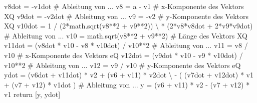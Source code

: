 \documentclass[
  letterpaper,
  DIV=11,
  oneside]{scrreprt}
\newenvironment{Shaded}{\begin{snugshade}}{\end{snugshade}}
\newcommand{\CommentTok}[1]{\textcolor[rgb]{0.37,0.37,0.37}{#1}}
\newcommand{\ControlFlowTok}[1]{\textcolor[rgb]{0.00,0.23,0.31}{#1}}
\newcommand{\DecValTok}[1]{\textcolor[rgb]{0.68,0.00,0.00}{#1}}
\newcommand{\NormalTok}[1]{\textcolor[rgb]{0.00,0.23,0.31}{#1}}
\newcommand{\OperatorTok}[1]{\textcolor[rgb]{0.37,0.37,0.37}{#1}}
\theoremstyle{definition}
\theoremstyle{definition}
\theoremstyle{remark}
\begin{document}
\begin{tcolorbox}
\begin{Shaded}
\begin{Highlighting}[]
\NormalTok{    v8dot }\OperatorTok{=} \OperatorTok{{-}}\NormalTok{v1dot     }\CommentTok{\# Ableitung von ...}
\NormalTok{    v8 }\OperatorTok{=}\NormalTok{ a }\OperatorTok{{-}}\NormalTok{ v1        }\CommentTok{\# x{-}Komponente des Vektors XQ}
\NormalTok{    v9dot }\OperatorTok{=} \OperatorTok{{-}}\NormalTok{v2dot     }\CommentTok{\# Ableitung von ...}
\NormalTok{    v9 }\OperatorTok{=} \OperatorTok{{-}}\NormalTok{v2           }\CommentTok{\# y{-}Komponente des Vektors XQ}
\NormalTok{    v10dot }\OperatorTok{=} \DecValTok{1} \OperatorTok{/}\NormalTok{ (}\DecValTok{2}\OperatorTok{*}\NormalTok{math.sqrt(v8}\OperatorTok{**}\DecValTok{2} \OperatorTok{+}\NormalTok{ v9}\OperatorTok{**}\DecValTok{2}\NormalTok{)) }\OperatorTok{\textbackslash{}}
        \OperatorTok{*}\NormalTok{ (}\DecValTok{2}\OperatorTok{*}\NormalTok{v8}\OperatorTok{*}\NormalTok{v8dot }\OperatorTok{+} \DecValTok{2}\OperatorTok{*}\NormalTok{v9}\OperatorTok{*}\NormalTok{v9dot)  }\CommentTok{\# Ableitung von ...}
\NormalTok{    v10 }\OperatorTok{=}\NormalTok{ math.sqrt(v8}\OperatorTok{**}\DecValTok{2} \OperatorTok{+}\NormalTok{ v9}\OperatorTok{**}\DecValTok{2}\NormalTok{)  }\CommentTok{\# Länge des Vektors XQ}
\NormalTok{    v11dot }\OperatorTok{=}\NormalTok{ (v8dot }\OperatorTok{*}\NormalTok{ v10 }\OperatorTok{{-}}\NormalTok{ v8 }\OperatorTok{*}\NormalTok{ v10dot) }\OperatorTok{/}\NormalTok{ v10}\OperatorTok{**}\DecValTok{2}  \CommentTok{\# Ableitung von ...}
\NormalTok{    v11 }\OperatorTok{=}\NormalTok{ v8 }\OperatorTok{/}\NormalTok{ v10     }\CommentTok{\# x{-}Komponente des Vektors eQ    }
\NormalTok{    v12dot }\OperatorTok{=}\NormalTok{ (v9dot }\OperatorTok{*}\NormalTok{ v10 }\OperatorTok{{-}}\NormalTok{ v9 }\OperatorTok{*}\NormalTok{ v10dot) }\OperatorTok{/}\NormalTok{ v10}\OperatorTok{**}\DecValTok{2}  \CommentTok{\# Ableitung von ... }
\NormalTok{    v12 }\OperatorTok{=}\NormalTok{ v9 }\OperatorTok{/}\NormalTok{ v10     }\CommentTok{\# y{-}Komponente des Vektors eQ   }
\NormalTok{    ydot }\OperatorTok{=}\NormalTok{ (v6dot }\OperatorTok{+}\NormalTok{ v11dot) }\OperatorTok{*}\NormalTok{ v2 }\OperatorTok{+}\NormalTok{ (v6 }\OperatorTok{+}\NormalTok{ v11) }\OperatorTok{*}\NormalTok{ v2dot }\OperatorTok{\textbackslash{}}
        \OperatorTok{{-}}\NormalTok{ ( (v7dot }\OperatorTok{+}\NormalTok{ v12dot) }\OperatorTok{*}\NormalTok{ v1 }\OperatorTok{+}\NormalTok{ (v7 }\OperatorTok{+}\NormalTok{ v12) }\OperatorTok{*}\NormalTok{ v1dot )  }\CommentTok{\# Ableitung von ...}
\NormalTok{    y }\OperatorTok{=}\NormalTok{ (v6 }\OperatorTok{+}\NormalTok{ v11) }\OperatorTok{*}\NormalTok{ v2 }\OperatorTok{{-}}\NormalTok{ (v7 }\OperatorTok{+}\NormalTok{ v12) }\OperatorTok{*}\NormalTok{ v1}
    \ControlFlowTok{return}\NormalTok{ [y, ydot]   }


\end{Highlighting}
\end{Shaded}
\end{tcolorbox}
\end{document}
